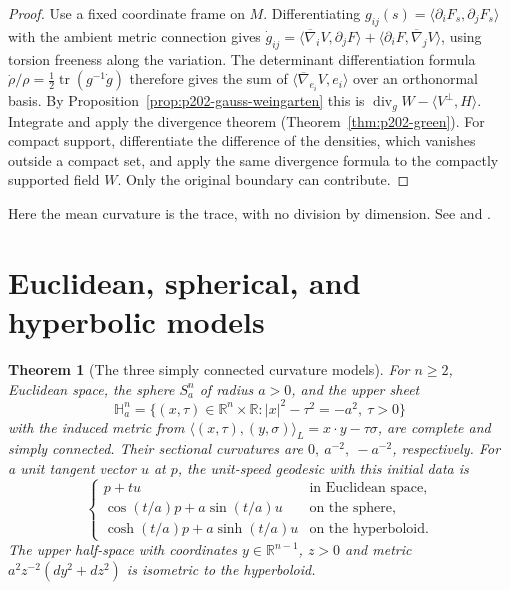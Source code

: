 \documentclass[11pt,oneside,openany]{book}
\theoremstyle{plain}
\newtheorem{theorem}{Theorem}[chapter]
\theoremstyle{definition}
\theoremstyle{remark}
\newcommand{\R}{\mathbb R}
\begin{document}
\begin{proof}
Use a fixed coordinate frame on \(M\). Differentiating
\(g_{ij}(s)=\langle\partial_iF_s,\partial_jF_s\rangle\) with
the ambient metric connection gives
\(\dot g_{ij}=\langle\overline\nabla_iV,\partial_jF\rangle+
\langle\partial_iF,\overline\nabla_jV\rangle\), using
torsion freeness along the variation.
The determinant differentiation formula
\(\dot\rho/\rho=\tfrac12\operatorname{tr}(g^{-1}\dot g)\)
therefore gives the sum of
\(\langle\overline\nabla_{e_i}V,e_i\rangle\)
over an orthonormal basis.
By Proposition~\ref{prop:p202-gauss-weingarten} this is
\(\operatorname{div}_g W-\langle V^\perp,H\rangle\).
Integrate and apply the divergence theorem
(Theorem~\ref{thm:p202-green}). For compact support, differentiate
the difference of the densities, which vanishes outside a compact
set, and apply the same divergence formula to the compactly
supported field \(W\). Only the original boundary can contribute.
\end{proof}

Here the mean curvature is the trace, with no division by dimension.
See \cite[Chapter 8, including the volume variation]{LeeRM}
and \cite[Chapter 6]{dC}.

\section{Euclidean, spherical, and hyperbolic models}\label{p202:G03}

\begin{theorem}[The three simply connected curvature models]
\label{thm:p202-models}
For \(n\ge2\), Euclidean space, the sphere \(S^n_a\) of radius
\(a>0\), and the upper sheet
\[
 \mathbb H^n_a=\{(x,\tau)\in\R^n\times\R:
           \lvert x\rvert^2-\tau^2=-a^2,\ \tau>0\}
\]
with the induced metric from \(\langle(x,\tau),(y,\sigma)\rangle_L
=x\cdot y-\tau\sigma\), are complete and simply connected. Their
sectional curvatures are \(0,\ a^{-2},\ -a^{-2}\), respectively.
For a unit tangent vector \(u\) at \(p\), the unit-speed geodesic
with this initial data is
\[
 \begin{cases}
 p+t u &\text{in Euclidean space},\\
 \cos(t/a)p+a\sin(t/a)u &\text{on the sphere},\\
 \cosh(t/a)p+a\sinh(t/a)u &\text{on the hyperboloid}.
 \end{cases}
\]
The upper half-space with coordinates \(y\in\R^{n-1}\), \(z>0\)
and metric \(a^2z^{-2}(dy^2+dz^2)\) is isometric to the hyperboloid.
\end{theorem}
\end{document}
